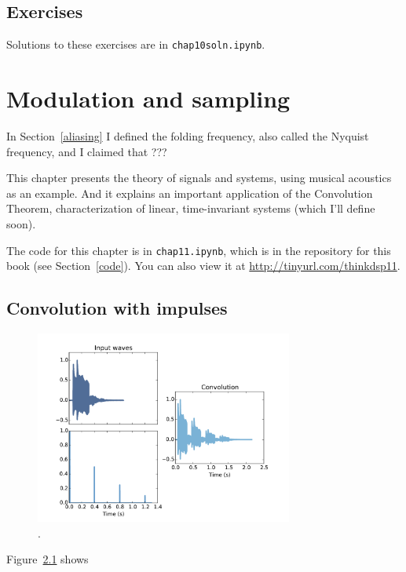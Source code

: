 \documentclass[12pt]{book}
\begin{document}
\section{Exercises}

\begin{exercise}
\end{exercise}

\begin{exercise}
\end{exercise}

Solutions to these exercises are in {\tt chap10soln.ipynb}.


\chapter{Modulation and sampling}

In Section~\ref{aliasing} I defined the folding frequency, also called
the Nyquist frequency, and I claimed that ???

This chapter presents the theory of signals and systems, using
musical acoustics as an example.  And it explains an
important application of the Convolution Theorem, characterization
of linear, time-invariant systems (which I'll define soon).

The code for this chapter is in {\tt chap11.ipynb}, which is in the
repository for this book (see Section~\ref{code}).
You can also view it at \url{http://tinyurl.com/thinkdsp11}.


\section{Convolution with impulses}

\begin{figure}
\centerline{\includegraphics[height=2.5in]{figs/sampling1.pdf}}
\caption{.}
\label{fig.sampling1}
\end{figure}

Figure~\ref{fig.sampling1} shows 
\end{document}
